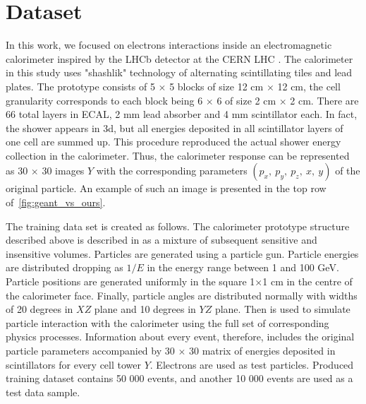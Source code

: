 \section{Dataset}
In this work, we focused on electrons interactions inside an electromagnetic calorimeter inspired by the LHCb detector at the CERN LHC \cite{Alves:2008zz}. The calorimeter in this study uses "shashlik" technology of alternating scintillating tiles and lead plates. The prototype  consists of 5 $\times$ 5 blocks of size 12 cm $\times$ 12 cm, the cell granularity corresponds to each block being 6 $\times$ 6 of size 2 cm $\times$ 2 cm. There are 66 total layers in ECAL, 2 mm lead absorber and 4 mm scintillator each. In fact, the shower appears in 3d, but all energies deposited in all scintillator layers of one cell are summed up. This procedure reproduced the actual shower energy collection in the calorimeter. Thus, the calorimeter response can be represented as 30 $\times$ 30 images $Y$ with the corresponding parameters $(p_x,~ p_y,~ p_z,~ x,~ y)$ of the original particle. An example of such an image is presented in the top row of~\cref{fig:geant_vs_ours}.

The training data set is created as follows. The calorimeter prototype structure described above is described in \geant as a  mixture of subsequent sensitive and insensitive volumes. Particles are generated using a particle gun. Particle energies are distributed dropping as $1/E$ in the energy range between 1 and 100 GeV. Particle positions are generated uniformly in the square 1$\times$1 cm in the centre of the calorimeter face. Finally, particle angles are distributed normally with widths of 20 degrees in $XZ$ plane and 10 degrees in $YZ$ plane. Then \geant is used to simulate particle interaction with the calorimeter using the full set of corresponding physics processes. Information about every event, therefore, includes the original particle parameters accompanied by 30 $\times$ 30 matrix of energies deposited in scintillators for every cell tower $Y$. Electrons are used as test particles. Produced training dataset contains 50 000 events, and another 10 000 events are used as a  test data sample.
